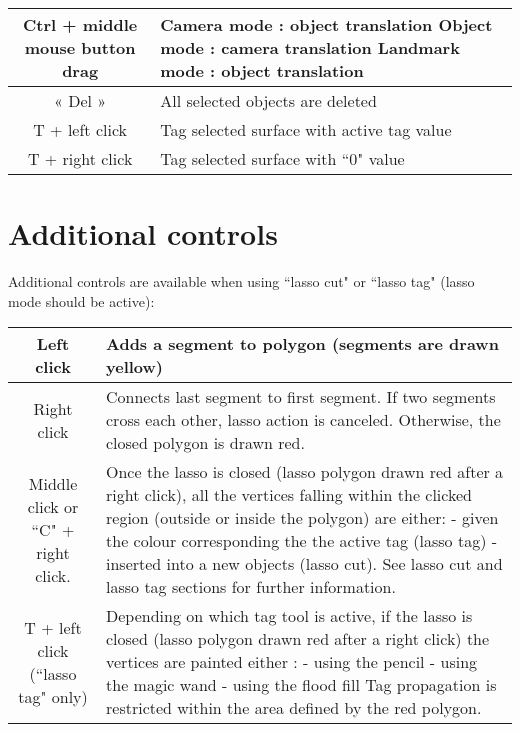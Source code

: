 \begin{tabularx}{\linewidth}{ | c | X | }
Ctrl + middle mouse button drag 
& Camera mode : object translation\newline
Object mode : camera translation\newline
Landmark mode : object translation \\ \hline			

« Del » & All selected objects are deleted \\ \hline			

T + left click & Tag selected surface with active tag value \\ \hline			
 
T + right click & Tag selected surface with ``0" value \\ \hline			

 \end{tabularx}

\section{Additional controls}
Additional controls are available when using ``lasso cut" or ``lasso tag" (lasso mode should be active):\\
\begin{tabularx}{\linewidth}{ | c | X | }
\hline			
Left click & Adds a segment to polygon (segments are drawn yellow) \\ \hline			

Right click & Connects last segment to first segment. If two segments cross each other, lasso action is canceled. Otherwise, the closed polygon is drawn red.\\ \hline			

Middle click or ``C" + right click. & Once the lasso is closed (lasso polygon drawn red
after a right click), all the vertices falling within the clicked region (outside or inside the polygon) are either:\newline
- given the colour corresponding the the active tag (lasso tag)\newline
- inserted into a new objects (lasso cut).\newline 
See lasso cut and lasso tag sections for further information.\\ \hline	
		
T + left click (``lasso tag" only) & Depending on which tag tool is active, if the
lasso is closed (lasso polygon drawn red after a right click) the vertices are painted either :\newline 
- using the pencil\newline 
- using the magic wand\newline 
- using the flood fill\newline 
Tag propagation is restricted within the area defined by the red polygon.\\ \hline		
	
\end{tabularx}

